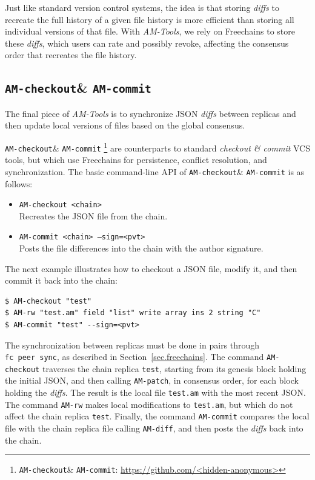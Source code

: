 \documentclass[12pt]{article}
\newcommand{\AMT}      {\emph{AM-Tools}\xspace}
\newcommand{\code}[1]  {\texttt{\footnotesize{#1}}}
\newcommand{\amrw}       {\code{AM-rw}\xspace}
\newcommand{\amdiff}     {\code{AM-diff}\xspace}
\newcommand{\ampatch}    {\code{AM-patch}\xspace}
\newcommand{\amcheckout} {\code{AM-checkout}\xspace}
\newcommand{\amcommit}   {\code{AM-commit}\xspace}
\begin{document}
Just like standard version control systems, the idea is that storing
\emph{diffs} to recreate the full history of a given file history is more
efficient than storing all individual versions of that file.
%
With \AMT, we rely on Freechains to store these \emph{diffs}, which users can
rate and possibly revoke, affecting the consensus order that recreates the file
history.

\subsection{\amcheckout \& \amcommit}

The final piece of \AMT is to synchronize JSON \emph{diffs} between replicas
and then update local versions of files based on the global consensus.

\amcheckout \& \amcommit%
    \footnote{\amcheckout \& \amcommit: \url{https://github.com/<hidden-anonymous>}}
are counterparts to standard \emph{checkout \& commit} VCS tools, but which use
Freechains for persistence, conflict resolution, and synchronization.
%
The basic command-line API of \amcheckout \& \amcommit is as follows:

\begin{itemize}
\item \code{AM-checkout <chain>} \\
    Recreates the JSON file from the chain.
\item \code{AM-commit <chain> --sign=<pvt>} \\
    Posts the file differences into the chain with the author signature.
\end{itemize}

The next example illustrates how to checkout a JSON file, modify it, and then
commit it back into the chain:

{\footnotesize
\begin{verbatim}
$ AM-checkout "test"
$ AM-rw "test.am" field "list" write array ins 2 string "C"
$ AM-commit "test" --sign=<pvt>
\end{verbatim}
}

The synchronization between replicas must be done in pairs through
\code{fc~peer~sync}, as described in Section~\ref{sec.freechains}.
%
The command \amcheckout traverses the chain replica \code{test}, starting from
its genesis block holding the initial JSON, and then calling \ampatch, in
consensus order, for each block holding the \emph{diffs}.
The result is the local file \code{test.am} with the most recent JSON.
%
The command \amrw makes local modifications to \code{test.am}, but which do not
affect the chain replica \code{test}.
%
Finally, the command \amcommit compares the local file with the chain replica
file calling \amdiff, and then posts the \emph{diffs} back into the chain.
\end{document}
